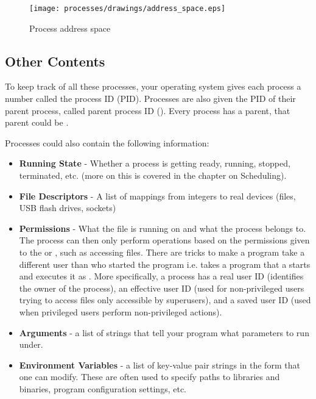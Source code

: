 \begin{figure}[H]
\centering
\texttt{[image: processes/drawings/address\_space.eps]}
\caption{Process address space}
\end{figure}



\subsection{Other Contents}

To keep track of all these processes, your operating system gives each process a number called the process ID (PID).
Processes are also given the PID of their parent process, called parent process ID ().
Every process has a parent, that parent could be .

Processes could also contain the following information:

\begin{itemize}
    \item \textbf{Running State} - Whether a process is getting ready, running, stopped, terminated, etc. (more on this is covered in the chapter on Scheduling).
    \item \textbf{File Descriptors} - A list of mappings from integers to real devices (files, USB flash drives, sockets)
    \item \textbf{Permissions} - What  the file is running on and what  the process belongs to.
          The process can then only perform operations based on the permissions given to the  or , such as accessing files.
          There are tricks to make a program take a different user than who started the program i.e.  takes a program that a  starts and executes it as .
          More specifically, a process has a real user ID (identifies the owner of the process), an effective user ID (used for non-privileged users trying to access files only accessible by superusers), and a saved user ID (used when privileged users perform non-privileged actions).
    \item \textbf{Arguments} - a list of strings that tell your program what parameters to run under.
    \item \textbf{Environment Variables} - a list of key-value pair strings in the form  that one can modify. These are often used to specify paths to libraries and binaries, program configuration settings, etc.
\end{itemize}

